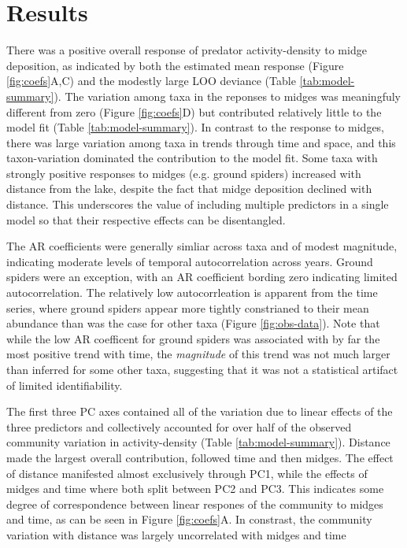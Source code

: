 

\section*{Results}

There was a positive overall response of predator activity-density to midge deposition,
as indicated by both the estimated mean response
(Figure \ref{fig:coefs}A,C)
and the modestly large LOO deviance (Table \ref{tab:model-summary}).
The variation among taxa in the reponses to midges was meaningfuly different from zero
(Figure \ref{fig:coefs}D)
but contributed relatively little to the
model fit (Table \ref{tab:model-summary}).
In contrast to the response to midges,
there was large variation among taxa in trends through time and space,
and this taxon-variation dominated the contribution to the model fit.
Some taxa with strongly positive responses to midges (e.g. ground spiders)
increased with distance from the lake,
despite the fact that midge deposition declined with distance.
This underscores the value of including multiple predictors in a single model
so that their respective effects can be disentangled.

The AR coefficients were generally simliar across taxa and of modest magnitude,
indicating moderate levels of temporal autocorrelation across years.
Ground spiders were an exception,
with an AR coefficient bording zero indicating limited autocorrelation.
The relatively low autocorrleation is apparent from the time series,
where ground spiders appear more tightly constrianed to their mean abundance
than was the case for other taxa (Figure \ref{fig:obs-data}).
Note that while the low AR coefficent for ground spiders was associated
with by far the most positive trend with time,
the \textit{magnitude} of this trend was not much larger than inferred for some other taxa,
suggesting that it was not a statistical artifact of limited identifiability.

The first three PC axes contained all of the variation
due to linear effects of the three predictors and
collectively accounted for over half of the observed community variation
in activity-density (Table \ref{tab:model-summary}).
Distance made the largest overall contribution,
followed time and then midges.
The effect of distance manifested almost exclusively through PC1,
while the effects of midges and time where both split between PC2 and PC3.
This indicates some degree of correspondence between linear respones of the community
to midges and time, as can be seen in Figure \ref{fig:coefs}A.
In constrast, the community variation with distance
was largely uncorrelated with midges and time

